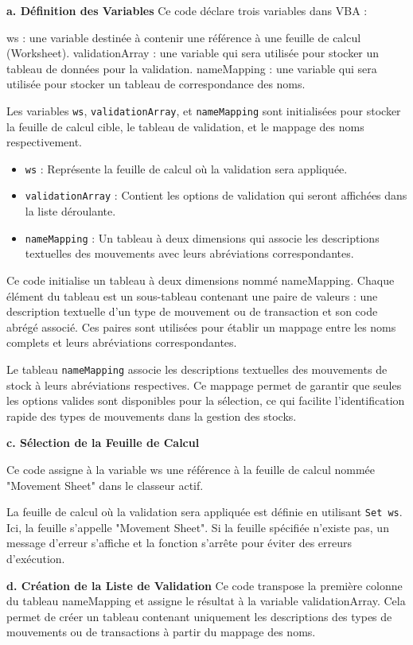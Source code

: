 \documentclass[a4paper, oneside, 12pt, final]{extreport}
\begin{document}
\textbf{a. Définition des Variables}
Ce code déclare trois variables dans VBA :

ws : une variable destinée à contenir une référence à une feuille de calcul (Worksheet).
validationArray : une variable qui sera utilisée pour stocker un tableau de données pour la validation.
nameMapping : une variable qui sera utilisée pour stocker un tableau de correspondance des noms.

Les variables \texttt{ws}, \texttt{validationArray}, et \texttt{nameMapping} sont initialisées pour stocker la feuille de calcul cible, le tableau de validation, et le mappage des noms respectivement.

\begin{itemize}
    \item \texttt{ws} : Représente la feuille de calcul où la validation sera appliquée.
    \item \texttt{validationArray} : Contient les options de validation qui seront affichées dans la liste déroulante.
    \item \texttt{nameMapping} : Un tableau à deux dimensions qui associe les descriptions textuelles des mouvements avec leurs abréviations correspondantes.
\end{itemize}
Ce code initialise un tableau à deux dimensions nommé nameMapping. Chaque élément du tableau est un sous-tableau contenant une paire de valeurs : une description textuelle d'un type de mouvement ou de transaction et son code abrégé associé. Ces paires sont utilisées pour établir un mappage entre les noms complets et leurs abréviations correspondantes.

Le tableau \texttt{nameMapping} associe les descriptions textuelles des mouvements de stock à leurs abréviations respectives. Ce mappage permet de garantir que seules les options valides sont disponibles pour la sélection, ce qui facilite l'identification rapide des types de mouvements dans la gestion des stocks.

\textbf{c. Sélection de la Feuille de Calcul}

Ce code assigne à la variable ws une référence à la feuille de calcul nommée "Movement Sheet" dans le classeur actif.

La feuille de calcul où la validation sera appliquée est définie en utilisant \texttt{Set ws}. Ici, la feuille s'appelle "Movement Sheet". Si la feuille spécifiée n'existe pas, un message d'erreur s'affiche et la fonction s'arrête pour éviter des erreurs d'exécution.

\textbf{d. Création de la Liste de Validation}
Ce code transpose la première colonne du tableau nameMapping et assigne le résultat à la variable validationArray. Cela permet de créer un tableau contenant uniquement les descriptions des types de mouvements ou de transactions à partir du mappage des noms.
\end{document}

